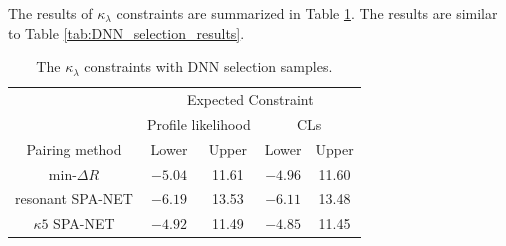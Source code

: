 \documentclass[12pt]{article}
\begin{document}
		The results of $\kappa_\lambda$ constraints are summarized in Table \ref{tab:kappa_constraint3}. The results are similar to Table \ref{tab:DNN_selection_results}.
		\begin{table}[htpb]
			\centering
			\caption{The $\kappa_\lambda$ constraints with DNN selection samples.}
			\label{tab:kappa_constraint3}
			\begin{tabular}{c|cc|cc}
								  & \multicolumn{4}{c}{Expected Constraint}                          \\
								  & \multicolumn{2}{c}{Profile likelihood} & \multicolumn{2}{c}{CLs} \\ \hline
			Pairing method        & Lower              & Upper             & Lower      & Upper      \\ \hline
			$\text{min-}\Delta R$ & $-5.04$            & 11.61             & $-4.96$      & 11.60      \\
			resonant SPA-NET      & $-6.19$            & 13.53             & $-6.11$      & 13.48      \\
			$\kappa 5$ SPA-NET    & $-4.92$            & 11.49             & $-4.85$      & 11.45   
			\end{tabular}
		\end{table}
\end{document}

